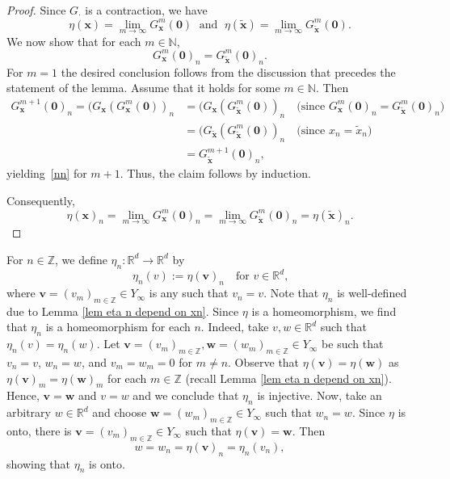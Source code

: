 \documentclass[reqno, a4paper, 10pt]{amsart}
\theoremstyle{plain}
\numberwithin{equation}{section}
\theoremstyle{remark}
\begin{document}
\begin{proof}
Since $G_{\cdot}$ is a contraction, we have 
\[
\eta(\mathbf x)=\lim_{m\to \infty}G_{\mathbf x}^m(\mathbf 0) \; \text{ and }\;  \eta(\tilde{\mathbf x})=\lim_{m\to \infty}G_{\tilde{\mathbf x}}^m(\mathbf 0).
\]
We now show that for each $m\in \mathbb N$, 
\begin{equation}\label{nn}
G_{\mathbf x}^m(\mathbf 0)_n=G_{\tilde{\mathbf x}}^m(\mathbf 0)_n.
\end{equation}
For $m=1$ the desired conclusion follows from the discussion that precedes the statement of the lemma. Assume that it holds for some $m\in \mathbb N$. Then 
\[
\begin{split}
G_{\mathbf x}^{m+1}(\mathbf 0)_n= (G_{\mathbf x} (G_{\mathbf x}^m(\mathbf 0))_n &=(G_{\mathbf x} (G_{\tilde{\mathbf x}}^m(\mathbf 0))_n  \quad \text{(since $G_{\mathbf x}^m(\mathbf 0)_n=G_{\tilde{\mathbf x}}^m(\mathbf 0)_n$)}\\
&=(G_{\tilde{\mathbf x}} (G_{\tilde{\mathbf x}}^m(\mathbf 0))_n \quad \text{(since $x_n=\tilde x_n$)}\\
&=G_{\tilde{\mathbf x}}^{m+1}(\mathbf 0)_n,
\end{split}
\]
yielding~\eqref{nn} for $m+1$. Thus, the claim follows by induction.

Consequently,
\[
\eta(\mathbf x)_n=\lim_{m\to \infty}G_\mathbf x^m(\mathbf 0)_n=\lim_{m\to \infty}G_{\tilde {\mathbf x}}^m(\mathbf 0)_n=\eta(\tilde{\mathbf x})_n.
\]
\end{proof}


For $n\in \mathbb Z$, we define $\eta_n \colon \mathbb R^d \to \mathbb R^d$ by 
\[
\eta_n(v):=\eta (\mathbf v)_n \quad \text{for $v\in \mathbb R^d$,}
\]
where $\mathbf v=(v_m)_{m\in \mathbb Z}\in Y_\infty$ is any such that $v_n=v$. Note that $\eta_n$ is well-defined due to Lemma \ref{lem eta n depend on xn}. Since $\eta$ is a homeomorphism, we find that $\eta_n$ is a homeomorphism for each $n$. Indeed, take $v, w\in \mathbb R^d$ such that $\eta_n(v)=\eta_n(w)$. Let $\mathbf v=(v_m)_{m\in \mathbb Z}, \mathbf w=(w_m)_{m\in \mathbb Z}\in Y_\infty$ be such that $v_n=v$, $w_n=w$, and $v_m=w_m=0$ for $m\neq n$.
Observe that $\eta(\mathbf v)=\eta(\mathbf w)$ as $\eta(\mathbf v)_m=\eta(\mathbf w)_m$ for each $m\in \mathbb Z$ (recall Lemma \ref{lem eta n depend on xn}). Hence, $\mathbf v=\mathbf w$ and $v=w$ and we conclude that $\eta_n$ is injective. Now, take an arbitrary $w\in \mathbb R^d$ and choose $\mathbf w=(w_m)_{m\in \mathbb Z}\in Y_\infty$ such that $w_n=w$. Since $\eta$ is onto, there is $\mathbf v=(v_m)_{m\in \mathbb Z}\in Y_\infty$ such that $\eta(\mathbf v)=\mathbf w$. Then
\[
w=w_n=\eta(\mathbf v)_n=\eta_n(v_n),
\]
showing that $\eta_n$ is onto.
\end{document}
